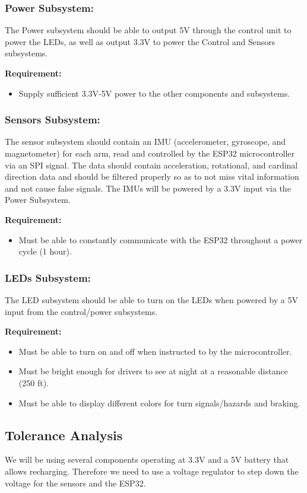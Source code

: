 \documentclass[12pt]{article}
\begin{document}
\subsubsection{Power Subsystem:} 
The Power subsystem should be able to output 5V through the control unit to power the LEDs, as well as output 3.3V to power the Control and Sensors subsystems. 

\textbf{Requirement:} 
\begin{itemize}
    \item Supply sufficient 3.3V-5V power to the 
    other components and subsystems.
\end{itemize}

\subsubsection{Sensors Subsystem:}
The sensor subsystem should contain an IMU (accelerometer, gyroscope, and magnetometer) for each arm, read and controlled by the ESP32 microcontroller via an SPI signal. The data should contain acceleration, rotational, and cardinal direction data and should be filtered properly so as to not miss vital information and not cause false signals. The IMUs will be powered by a 3.3V input via the Power Subsystem.

\textbf{Requirement:}
\begin{itemize}
    \item Must be able to constantly communicate with the 
    ESP32 throughout a power cycle (1 hour). 
\end{itemize}

\subsubsection{LEDs Subsystem:} 
The LED subsystem should be able to turn on the LEDs when powered by a 5V input from the control/power subsystems.

\textbf{Requirement:} 
\begin{itemize}
    \item Must be able to turn on and off when instructed to by the microcontroller.
    \item Must be bright enough for drivers to see at night at a reasonable distance (250 ft).
    \item Must be able to display different colors for turn signals/hazards and braking.
\end{itemize}

\subsection{Tolerance Analysis}
We will be using several components operating at 3.3V and a 5V 
battery that allows recharging. Therefore we need to use a 
voltage regulator to step down the voltage for the sensors 
and the ESP32. 
\end{document}
